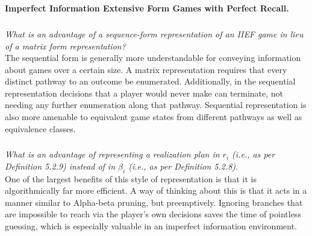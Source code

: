 \documentclass[12pt]{amsart}
\begin{document}
\subsection{}
\textbf{Imperfect Information Extensive Form Games with Perfect Recall.}

\subsubsection{}
\textit{What is an advantage of a sequence-form representation of an IIEF game in lieu of a
	matrix form representation?} \\
	
	The sequential form is generally more understandable for conveying information about games over a certain size.
	A matrix representation requires that every distinct pathway to an outcome be enumerated. 
	Additionally, in the sequential representation decisions that a player would never make can terminate, 
	not needing any further enumeration along that pathway. 
	Sequential representation is also more amenable to equivalent game states from different pathways
	as well as equivalence classes.

\subsubsection{}
\textit{What is an advantage of representing a realization plan in $r_i$ (i.e., as per Definition 5.2.9)
	instead of in $\beta_i$ (i.e., as per Definition 5.2.8).} \\

	One of the largest benefits of this style of representation is that it is algorithmically far more efficient.
	A way of thinking about this is that it acts in a manner similar to Alpha-beta pruning, but preemptively.
	Ignoring branches that are impossible to reach via the player's own decisions saves the time of pointless
	guessing, which is especially valuable in an imperfect information environment.
\end{document}
